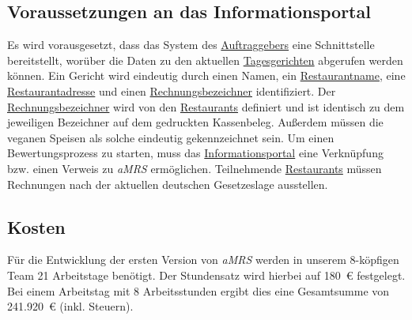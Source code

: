 \subsection{Voraussetzungen an das Informationsportal}
Es wird vorausgesetzt, dass das System des \hyperref[gls:auftraggeber]{Auftraggebers} eine Schnittstelle bereitstellt, worüber die Daten zu den aktuellen \hyperref[gls:tagesgericht]{Tagesgerichten} abgerufen werden können.
Ein Gericht wird eindeutig durch einen Namen, ein \hyperref[gls:restaurantname]{Restaurantname}, eine \hyperref[gls:restaurantadresse]{Restaurantadresse} und einen \hyperref[gls:Rechnungsbezeichner]{Rechnungsbezeichner} identifiziert.
Der \hyperref[gls:Rechnungsbezeichner]{Rechnungsbezeichner} wird von den \hyperref[gls:restaurant]{Restaurants} definiert und ist identisch zu dem jeweiligen Bezeichner auf dem gedruckten Kassenbeleg.
Außerdem müssen die veganen Speisen als solche eindeutig gekennzeichnet sein.
\newparagraph
Um einen Bewertungsprozess zu starten, muss das \hyperref[gls:informationsportal]{Informationsportal} eine Verknüpfung bzw. einen Verweis zu \textit{\ac{aMRS}} ermöglichen.
Teilnehmende \hyperref[gls:restaurant]{Restaurants} müssen Rechnungen nach der aktuellen deutschen Gesetzeslage ausstellen.

\subsection{Kosten}


Für die Entwicklung der ersten Version von \textit{\ac{aMRS}} werden in unserem 8-köpfigen Team 21 Arbeitstage benötigt.
Der Stundensatz wird hierbei auf 180~€ festgelegt.
Bei einem Arbeitstag mit 8 Arbeitsstunden ergibt dies eine Gesamtsumme von 241.920~€ (inkl. Steuern).


